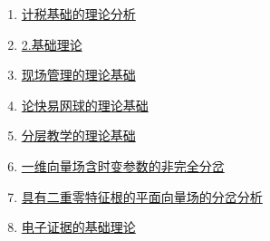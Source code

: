 \documentclass{article}
\begin{document}
\begin{enumerate}
\item
  \href{https://www.ixueshu.com/api/search/info/214c9856c46110074aa829a3e2793c5b318947a18e7f9386.html?from=pdf}{{计税基础的理论分析}}
\item
  \href{https://www.ixueshu.com/api/search/info/16c147a8ae4f40380dca8f358f391cf7318947a18e7f9386.html?from=pdf}{{2.基础理论}}
\item
  \href{https://www.ixueshu.com/api/search/info/6880d4cbb106d1b5f8886f61ce516b76318947a18e7f9386.html?from=pdf}{{现场管理的理论基础}}
\item
  \href{https://www.ixueshu.com/api/search/info/2748d45327f762db44a3b899707ad492318947a18e7f9386.html?from=pdf}{{论快易网球的理论基础}}
\item
  \href{https://www.ixueshu.com/api/search/info/16c147a8ae4f4038987f902320cbe9d6318947a18e7f9386.html?from=pdf}{{分层教学的理论基础}}
\item
  \href{https://www.ixueshu.com/api/search/info/df79d37cc467dbb9e85944743c450306318947a18e7f9386.html?from=pdf}{{一维向量场含时变参数的非完全分岔}}
\item
  \href{https://www.ixueshu.com/api/search/info/1b154ecb637fc9ea14bfe24b4944e15a318947a18e7f9386.html?from=pdf}{{具有二重零特征根的平面向量场的分岔分析}}
\item
  \href{https://www.ixueshu.com/api/search/info/99b122264be0bceee2cabdce0bd5f19d318947a18e7f9386.html?from=pdf}{{电子证据的基础理论}}
\end{enumerate}
\end{document}
